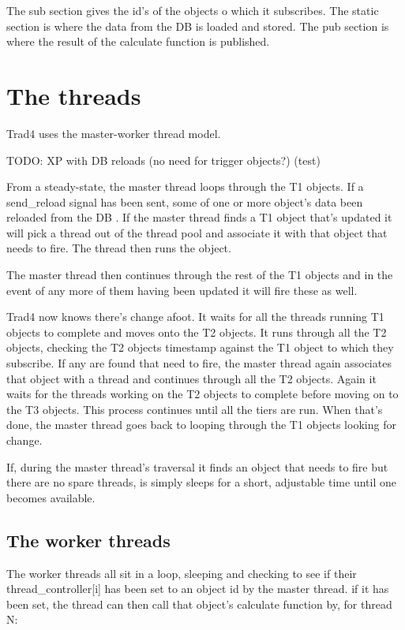 \documentclass{report}
\begin{document}
The sub section gives the id's of the objects o which it subscribes. The static section is where the data from the DB is loaded and stored. The pub section is where the result of the calculate function is published.

\section{The threads}

Trad4 uses the master-worker thread model.

TODO: XP with DB reloads (no need for trigger objects?) (test)

From a steady-state, the master thread loops through the T1 objects. If a send_reload signal has been sent, some of one or more object's data been reloaded from the DB . If the master thread finds a T1 object that's updated it will pick a thread out of the thread pool and associate it with that object that needs to fire. The thread then runs the object. 

The master thread then continues through the rest of the T1 objects and in the event of any more of them having been updated it will fire these as well.

Trad4 now knows there's change afoot. It waits for all the threads running T1 objects to complete and moves onto the T2 objects. It runs through all the T2 objects, checking the T2 objects timestamp against the T1 object to which they subscribe. If any are found that need to fire, the master thread again associates that object with a thread and continues through all the T2 objects. Again it waits for the threads working on the T2 objects to complete before moving on to the T3 objects.  This process continues until all the tiers are run. When that's done, the master thread goes back to looping through the T1 objects looking for change.  

If, during the master thread's traversal it finds an object that needs to fire but there are no spare threads, is simply sleeps for a short, adjustable time until one becomes available.

\subsection{The worker threads}

The worker threads all sit in a loop, sleeping and checking to see if their thread_controller[i] has been set to an object id by the master thread. if it has been set, the thread can then call that object's calculate 
function by, for thread N:
\end{document}
